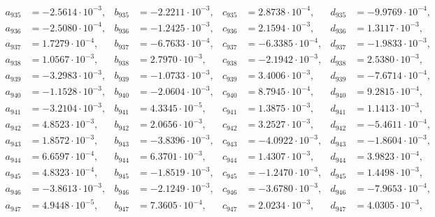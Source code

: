 \begin{align*}
  a_{ 935 } &= -2.5614 \cdot 10^{ -3 }, & b_{ 935 } &= -2.2211 \cdot 10^{ -3 }, & c_{ 935 } &= 2.8738 \cdot 10^{ -4 }, & d_{ 935 } &= -9.9769 \cdot 10^{ -4 }, \\ 
  a_{ 936 } &= -2.5080 \cdot 10^{ -4 }, & b_{ 936 } &= -1.2425 \cdot 10^{ -3 }, & c_{ 936 } &= 2.1594 \cdot 10^{ -3 }, & d_{ 936 } &= 1.3117 \cdot 10^{ -3 }, \\ 
  a_{ 937 } &= 1.7279 \cdot 10^{ -4 }, & b_{ 937 } &= -6.7633 \cdot 10^{ -4 }, & c_{ 937 } &= -6.3385 \cdot 10^{ -4 }, & d_{ 937 } &= -1.9833 \cdot 10^{ -3 }, \\ 
  a_{ 938 } &= 1.0567 \cdot 10^{ -3 }, & b_{ 938 } &= 2.7970 \cdot 10^{ -3 }, & c_{ 938 } &= -2.1942 \cdot 10^{ -3 }, & d_{ 938 } &= 2.5380 \cdot 10^{ -3 }, \\ 
  a_{ 939 } &= -3.2983 \cdot 10^{ -3 }, & b_{ 939 } &= -1.0733 \cdot 10^{ -3 }, & c_{ 939 } &= 3.4006 \cdot 10^{ -3 }, & d_{ 939 } &= -7.6714 \cdot 10^{ -4 }, \\ 
  a_{ 940 } &= -1.1528 \cdot 10^{ -3 }, & b_{ 940 } &= -2.0604 \cdot 10^{ -3 }, & c_{ 940 } &= 8.7945 \cdot 10^{ -4 }, & d_{ 940 } &= 9.2815 \cdot 10^{ -4 }, \\ 
  a_{ 941 } &= -3.2104 \cdot 10^{ -3 }, & b_{ 941 } &= 4.3345 \cdot 10^{ -5 }, & c_{ 941 } &= 1.3875 \cdot 10^{ -3 }, & d_{ 941 } &= 1.1413 \cdot 10^{ -3 }, \\ 
  a_{ 942 } &= 4.8523 \cdot 10^{ -3 }, & b_{ 942 } &= 2.0656 \cdot 10^{ -3 }, & c_{ 942 } &= 3.2527 \cdot 10^{ -3 }, & d_{ 942 } &= -5.4611 \cdot 10^{ -4 }, \\ 
  a_{ 943 } &= 1.8572 \cdot 10^{ -3 }, & b_{ 943 } &= -3.8396 \cdot 10^{ -3 }, & c_{ 943 } &= -4.0922 \cdot 10^{ -3 }, & d_{ 943 } &= -1.8604 \cdot 10^{ -3 }, \\ 
  a_{ 944 } &= 6.6597 \cdot 10^{ -4 }, & b_{ 944 } &= 6.3701 \cdot 10^{ -3 }, & c_{ 944 } &= 1.4307 \cdot 10^{ -3 }, & d_{ 944 } &= 3.9823 \cdot 10^{ -4 }, \\ 
  a_{ 945 } &= 4.8323 \cdot 10^{ -4 }, & b_{ 945 } &= -1.8519 \cdot 10^{ -3 }, & c_{ 945 } &= -1.2470 \cdot 10^{ -3 }, & d_{ 945 } &= 1.4498 \cdot 10^{ -3 }, \\ 
  a_{ 946 } &= -3.8613 \cdot 10^{ -3 }, & b_{ 946 } &= -2.1249 \cdot 10^{ -3 }, & c_{ 946 } &= -3.6780 \cdot 10^{ -3 }, & d_{ 946 } &= -7.9653 \cdot 10^{ -4 }, \\ 
  a_{ 947 } &= 4.9448 \cdot 10^{ -5 }, & b_{ 947 } &= 7.3605 \cdot 10^{ -4 }, & c_{ 947 } &= 2.0234 \cdot 10^{ -3 }, & d_{ 947 } &= 4.0305 \cdot 10^{ -3 }, \\ 

\end{align*}
